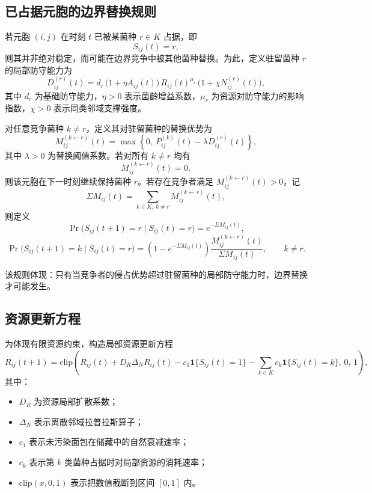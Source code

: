 \documentclass[12pt,a4paper]{ctexart}
\begin{document}
\subsection{已占据元胞的边界替换规则}

若元胞 \((i,j)\) 在时刻 \(t\) 已被某菌种 \(r\in K\) 占据，即
\[
S_{ij}(t)=r,
\]
则其并非绝对稳定，而可能在边界竞争中被其他菌种替换。为此，定义驻留菌种 \(r\) 的局部防守能力为
\begin{equation}
D_{ij}^{(r)}(t)
=
d_r\,
\bigl(1+\eta A_{ij}(t)\bigr)\,
R_{ij}(t)^{\mu_r}\,
\bigl(1+\chi N_{ij}^{(r)}(t)\bigr),
\label{eq:defense}
\end{equation}
其中 \(d_r\) 为基础防守能力，\(\eta>0\) 表示菌龄增益系数，\(\mu_r\) 为资源对防守能力的影响指数，\(\chi>0\) 表示同类邻域支撑强度。

对任意竞争菌种 \(k\neq r\)，定义其对驻留菌种的替换优势为
\[
M_{ij}^{(k\leftarrow r)}(t)=
\max\left\{0,\ P_{ij}^{(k)}(t)-\lambda D_{ij}^{(r)}(t)\right\},
\]
其中 \(\lambda>0\) 为替换阈值系数。若对所有 \(k\neq r\) 均有
\[
M_{ij}^{(k\leftarrow r)}(t)=0,
\]
则该元胞在下一时刻继续保持菌种 \(r\)。若存在竞争者满足 \(M_{ij}^{(k\leftarrow r)}(t)>0\)，记
\[
\Sigma M_{ij}(t)=\sum_{k\in K,\ k\neq r}M_{ij}^{(k\leftarrow r)}(t),
\]
则定义
\[
\Pr\bigl(S_{ij}(t+1)=r\mid S_{ij}(t)=r\bigr)=e^{-\Sigma M_{ij}(t)},
\]
\[
\Pr\bigl(S_{ij}(t+1)=k\mid S_{ij}(t)=r\bigr)
=
\left(1-e^{-\Sigma M_{ij}(t)}\right)
\frac{M_{ij}^{(k\leftarrow r)}(t)}{\Sigma M_{ij}(t)},\qquad k\neq r.
\]

该规则体现：只有当竞争者的侵占优势超过驻留菌种的局部防守能力时，边界替换才可能发生。

\subsection{资源更新方程}

为体现有限资源约束，构造局部资源更新方程
\begin{equation}
R_{ij}(t+1)=
\mathrm{clip}\left(
R_{ij}(t)
+
D_R\Delta_N R_{ij}(t)
-
c_1\mathbf{1}\{S_{ij}(t)=1\}
-
\sum_{k\in K}c_k\mathbf{1}\{S_{ij}(t)=k\},
\,0,\,1
\right),
\label{eq:resource}
\end{equation}
其中：
\begin{itemize}
    \item \(D_R\) 为资源局部扩散系数；
    \item \(\Delta_N\) 表示离散邻域拉普拉斯算子；
    \item \(c_1\) 表示未污染面包在储藏中的自然衰减速率；
    \item \(c_k\) 表示第 \(k\) 类菌种占据时对局部资源的消耗速率；
    \item \(\mathrm{clip}(x,0,1)\) 表示把数值截断到区间 \([0,1]\) 内。
\end{itemize}
\end{document}
